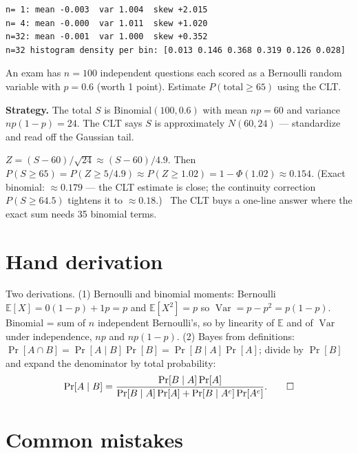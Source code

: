 \begin{lstlisting}[caption={Output of the CLT simulation. Notice the
skewness column --- $2.0$, $1.0$, $0.35$ --- is the honest version of
``becomes Gaussian'': it converges, it does not jump.}]
n= 1: mean -0.003  var 1.004  skew +2.015
n= 4: mean -0.000  var 1.011  skew +1.020
n=32: mean -0.001  var 1.000  skew +0.352
n=32 histogram density per bin: [0.013 0.146 0.368 0.319 0.126 0.028]
\end{lstlisting}

\begin{example}\label{ex:cltcalc}
An exam has $n=100$ independent questions each scored as a Bernoulli
random variable with $p=0.6$ (worth 1 point). Estimate
$P(\text{total}\geq 65)$ using the CLT.
\par\smallskip
\textbf{Strategy.} The total $S$ is Binomial$(100,0.6)$ with mean
$np=60$ and variance $np(1-p)=24$. The CLT says $S$ is approximately
$N(60,24)$ --- standardize and read off the Gaussian tail.
\begin{solution}
$Z=(S-60)/\sqrt{24}\approx(S-60)/4.9$. Then
$P(S\geq65)=P(Z\geq5/4.9)\approx P(Z\geq1.02)=1-\Phi(1.02)\approx
0.154$. (Exact binomial: $\approx0.179$ --- the CLT estimate is close;
the continuity correction $P(S\geq64.5)$ tightens it to
$\approx0.18$.) \checkmark\ The CLT buys a one-line answer where the
exact sum needs 35 binomial terms.
\end{solution}
\end{example}

\section{Hand derivation}\label{sec:handderiv12}

Two derivations. (1) Bernoulli and binomial moments: Bernoulli
$\mathbb E[X]=0(1-p)+1p=p$ and $\mathbb E[X^2]=p$ so
$\operatorname{Var}=p-p^{2}=p(1-p)$. Binomial = sum of $n$ independent
Bernoulli's, so by linearity of $\mathbb E$ and of $\operatorname{Var}$
under independence, $np$ and $np(1-p)$. (2) Bayes from definitions:
$\Pr[A\cap B]=\Pr[A\mid B]\Pr[B]=\Pr[B\mid A]\Pr[A]$; divide by
$\Pr[B]$ and expand the denominator by total probability:
\[
\Pr[A\mid B]=\frac{\Pr[B\mid A]\Pr[A]}
{\Pr[B\mid A]\Pr[A]+\Pr[B\mid A^{c}]\Pr[A^{c}]}.\qedhere
\]

\section{Common mistakes}\label{sec:prob-mistakes}

